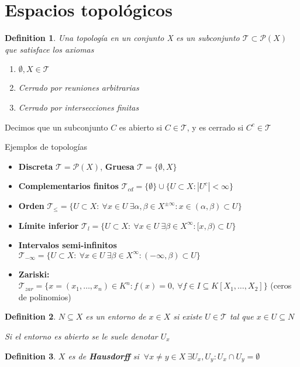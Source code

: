 \documentclass{myclass}
\newtheorem*{definition}{Definition}
\begin{document}
\section{Espacios topológicos}
\begin{definition}
Una topología en un conjunto X es un subconjunto $\mathcal{T} \subset \mathcal{P}(X)$ que satisface los axiomas
\begin{enumerate}[topsep=-6pt, itemsep=0pt]
  \item $\emptyset, X \in \mathcal{T} $
  \item Cerrado por reuniones arbitrarias
  \item Cerrado por intersecciones finitas
\end{enumerate}
\end{definition}
Decimos que un subconjunto $C$ es abierto si $C\in\mathcal{T}$, y es cerrado si $C^c \in  \mathcal{T}$

Ejemplos de topologías
\begin{itemize}[topsep=-6pt, itemsep=0pt]
  \item \textbf{Discreta} $\mathcal{T} = \mathcal{P}(X)$,  \textbf{Gruesa} $\mathcal{T}=\{\emptyset, X\}$
  \item \textbf{Complementarios finitos} $\mathcal{T}_{cd} = \{\emptyset\}\cup \{U \subset X : |U^c|<\infty\}$
  \item \textbf{Orden} $\mathcal{T}_{\le } = \{U\subset X: \ \forall  x \in U \ \exists \alpha , \beta \in X^{\pm \infty} : x\in (\alpha , \beta)\subset U\}$
  \item \textbf{Límite inferior} $\mathcal{T}_l = \{U\subset X : \ \forall  x\in U \ \exists \beta \in X^\infty  : [x, \beta )\subset  U\}$
  \item \textbf{Intervalos semi-infinitos} $\mathcal{T}_{-\infty}= \{U\subset X : \ \forall  x\in U \ \exists \beta \in X^\infty  : (-\infty, \beta )\subset  U\}$
  \item \textbf{Zariski:} $\mathcal{T}_{zar} = \{x = (x_1, \ldots, x_n)\in K^n : f(x)=0, \ \forall f\in I\subseteq K[X_1, \ldots, X_2]\}$ (ceros de polinomios)
\end{itemize}

\begin{definition}
$N\subseteq X$ es un entorno de $x\in X$ si existe $U\in \mathcal{T}$ tal que $x\in U \subseteq  N$

Si el entorno es abierto se le suele denotar $U_x$
\end{definition}

\begin{definition}
$X$ es de \textbf{Hausdorff} si $\ \forall x\neq y \in X \ \exists U_x, U_y : U_x\cap U_y =\emptyset$
\end{definition}
\end{document}
